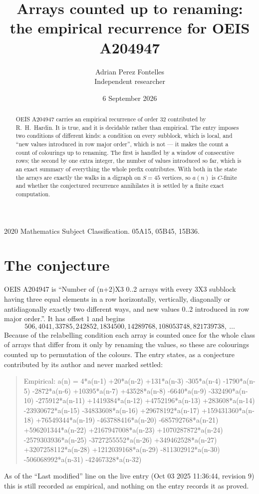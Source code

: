 \documentclass[11pt,a4paper]{article}
\title{Arrays counted up to renaming: the empirical recurrence for OEIS A204947}
\author{Adrian Perez Fontelles\\ \small Independent researcher}
\date{6 September 2026}
\theoremstyle{plain}
\theoremstyle{definition}
\begin{document}
\maketitle

\begin{abstract}
OEIS A204947 carries an empirical recurrence of order $32$ contributed by R.~H.~Hardin. It is
true, and it is decidable rather than empirical. The entry imposes two conditions of different
kinds: a condition on every subblock, which is local, and ``new values introduced in row major
order'', which is not --- it makes the count a count of colourings up to renaming. The first is
handled by a window of consecutive rows; the second by one extra integer, the number of values
introduced so far, which is an exact summary of everything the whole prefix contributes. With
both in the state the arrays are exactly the walks in a digraph on $S=45$ vertices, so $a(n)$
is $C$-finite and whether the conjectured recurrence annihilates it is settled by a finite
exact computation.
\end{abstract}

\noindent\small 2020 Mathematics Subject Classification. 05A15, 05B45, 15B36.\normalsize

\section{The conjecture}

OEIS A204947 is ``Number of (n+2)X3 0..2 arrays with every 3X3 subblock having three equal elements in a row horizontally, vertically, diagonally or antidiagonally exactly two different ways, and new values 0..2 introduced in row major order.''. It has offset $1$ and begins
\[
506, 4041, 33785, 242852, 1834500, 14289768, 108053748, 821739738,\ \dots
\]
Because of the relabelling condition each array is counted once for the whole class of arrays that differ from it only by renaming the values, so these are colourings counted up to permutation of the colours.
The entry states, as a conjecture contributed by its author and never marked settled:
\begin{quote}
Empirical: a(n) = 4*a(n-1) +20*a(n-2) +131*a(n-3) -305*a(n-4) -1790*a(n-5) -2872*a(n-6) +10395*a(n-7) +43528*a(n-8) -6640*a(n-9) -332490*a(n-10) -275912*a(n-11) +1419384*a(n-12) +4752196*a(n-13) +283608*a(n-14) -23930672*a(n-15) -34833608*a(n-16) +29678192*a(n-17) +159431360*a(n-18) +76549344*a(n-19) -463788416*a(n-20) -685792768*a(n-21) +596201344*a(n-22) +2167947008*a(n-23) +1070287872*a(n-24) -2579303936*a(n-25) -3727255552*a(n-26) +349462528*a(n-27) +3207258112*a(n-28) +1212039168*a(n-29) -811302912*a(n-30) -506068992*a(n-31) -42467328*a(n-32)
\end{quote}
As of the ``Last modified'' line on the live entry (Oct 03 2025 11:36:44, revision 9) this is still
recorded as empirical, and nothing on the entry records it as proved.
\end{document}
